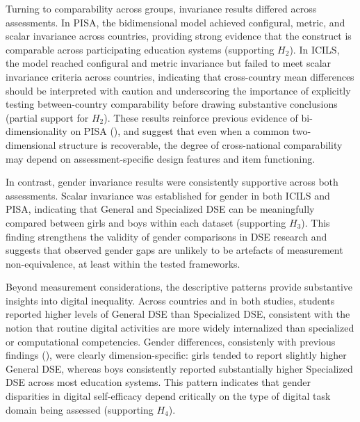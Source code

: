 \documentclass[
  letterpaper,
  DIV=11,
  numbers=noendperiod]{scrartcl}
\begin{document}
Turning to comparability across groups, invariance results differed
across assessments. In PISA, the bidimensional model achieved
configural, metric, and scalar invariance across countries, providing
strong evidence that the construct is comparable across participating
education systems (supporting \(H_2\)). In ICILS, the model reached
configural and metric invariance but failed to meet scalar invariance
criteria across countries, indicating that cross-country mean
differences should be interpreted with caution and underscoring the
importance of explicitly testing between-country comparability before
drawing substantive conclusions (partial support for \(H_2\)). These
results reinforce previous evidence of bi-dimensionality on PISA
(), and
suggest that even when a common two-dimensional structure is
recoverable, the degree of cross-national comparability may depend on
assessment-specific design features and item functioning.

In contrast, gender invariance results were consistently supportive
across both assessments. Scalar invariance was established for gender in
both ICILS and PISA, indicating that General and Specialized DSE can be
meaningfully compared between girls and boys within each dataset
(supporting \(H_3\)). This finding strengthens the validity of gender
comparisons in DSE research and suggests that observed gender gaps are
unlikely to be artefacts of measurement non-equivalence, at least within
the tested frameworks.

Beyond measurement considerations, the descriptive patterns provide
substantive insights into digital inequality. Across countries and in
both studies, students reported higher levels of General DSE than
Specialized DSE, consistent with the notion that routine digital
activities are more widely internalized than specialized or
computational competencies. Gender differences, consistenly with
previous findings (), were clearly dimension-specific: girls tended to report slightly
higher General DSE, whereas boys consistently reported substantially
higher Specialized DSE across most education systems. This pattern
indicates that gender disparities in digital self-efficacy depend
critically on the type of digital task domain being assessed (supporting
\(H_4\)).
\end{document}
